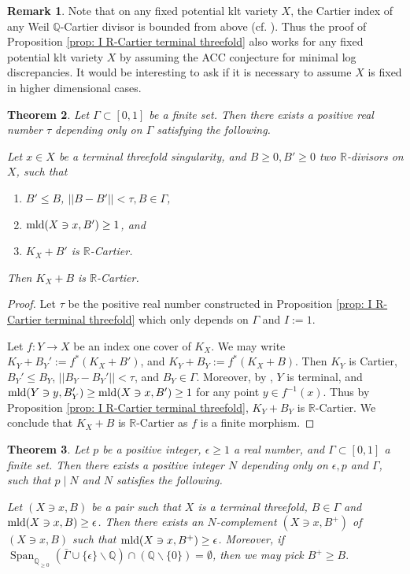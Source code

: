 \documentclass[11pt]{amsart}
\numberwithin{equation}{section}
\newcommand\han[1]{\todo[color=yellow!40]{#1}} %
\newcommand{\Qq}{\mathbb{Q}}
\newcommand{\Rr}{\mathbb{R}}
\newcommand{\Span}{\operatorname{Span}}
\newcommand{\mld}{{\rm{mld}}}
\newcommand{\Ii}{{\Gamma}}
\newtheorem{thm}{Theorem}[section]
\theoremstyle{definition}
\newtheorem{rem}[thm]{Remark}
\theoremstyle{definition}
\begin{document}
\begin{rem}
Note that on any fixed potential klt variety $X$, the Cartier index of any Weil $\Qq$-Cartier divisor is bounded from above (cf. \cite[Lemma 7.14]{CH21}). Thus the proof of Proposition \ref{prop: I R-Cartier terminal threefold} also works for any fixed potential klt variety $X$ by assuming the ACC conjecture for minimal log discrepancies. It would be interesting to ask if it is necessary to assume $X$ is fixed in higher dimensional cases. 
\end{rem}


\begin{thm}\label{thm: R-Cartier terminal threefold}
	Let $\Ii\subset [0,1]$ be a finite set. Then there exists a positive real number $\tau$ depending only on $\Ii$ satisfying the following. 
	
	Let $x\in X$ be a terminal threefold singularity, and $B\ge0,B'\ge0$ two $\Rr$-divisors on $X$, such that 
	\begin{enumerate}
	    \item $B'\le B$,  $||B-B'||<\tau,B\in\Ii$,
	    \item $\mld(X\ni x,B')\ge 1$,
	    and
	    \item $K_X+B'$ is $\Rr$-Cartier.
	\end{enumerate}
	Then $K_X+B$ is $\Rr$-Cartier.
\end{thm}
\begin{proof}
Let $\tau$ be the positive real number constructed in Proposition \ref{prop: I R-Cartier terminal threefold} which only depends on $\Ii$ and $I:=1$.

Let $f:Y\to X$ be an index one cover of $K_X$. We may write $K_Y+B_{Y}':=f^{*}(K_X+B')$, and $K_Y+B_{Y}:=f^{*}(K_X+B)$. Then $K_Y$ is Cartier, $B_{Y}'\le B_{Y}$, $||B_{Y}-B_{Y}'||<\tau$, and $B_Y\in\Ii$. Moreover, by \cite[Proposition 5.20]{KM98}, $Y$ is terminal, and $\mld(Y\ni y,B_{Y}')\ge \mld(X\ni x,B')\ge 1$ for any point $y\in f^{-1}(x)$. Thus by Proposition \ref{prop: I R-Cartier terminal threefold}, $K_Y+B_{Y}$ is $\Rr$-Cartier. We conclude that $K_X+B$ is $\Rr$-Cartier as $f$ is a finite morphism. %
\end{proof}



\begin{thm}\label{ref: main epsilon comp threefolds p version}
Let $p$ be a positive integer, $\epsilon\ge 1$ a real number, and $\Ii\subset [0,1]$ a finite set. Then there exists a positive integer $N$ depending only on $\epsilon,p$ and $\Ii$, such that $p\mid N$ and $N$ satisfies the following. 

Let $(X\ni x,B)$ be a pair such that $X$ is a terminal threefold, $B\in\Ii$ and $\mld(X\ni x,B)\geq \epsilon$. Then there exists an $N$-complement $(X\ni x,B^+)$ of $(X\ni x,B)$ such that $\mld(X\ni x,B^+)\geq \epsilon$. Moreover, if $\Span_{\Qq_{\ge0}}(\bar{\Ii}\cup\{\epsilon\}\backslash\Qq)\cap (\Qq\backslash\{0\})=\emptyset$, then we may pick $B^+\ge B.$ 
\end{thm}
\end{document}
